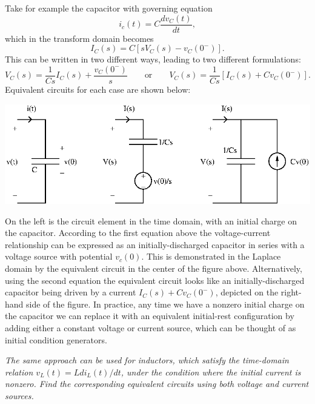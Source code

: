 \documentclass[10pt]{beamer}
\begin{document}
Take for example the capacitor with governing equation
\begin{equation*}
  i_c(t) = C \frac{d v_C(t)}{dt},
\end{equation*}
which in the transform domain becomes
\begin{equation*}
  I_C(s) = C \left[ s V_C(s) - v_C(0^-) \right].
\end{equation*}
This can be written in two different ways, leading to two different formulations:
\begin{equation*}
  V_C(s) = \frac{1}{Cs} I_C(s) + \frac{v_C(0^-)}{s} \qquad \text{or} \qquad
  V_C(s) = \frac{1}{Cs} [ I_C(s) + C v_C(0^-)].
\end{equation*}
Equivalent circuits for each case are shown below:
\begin{center}
  \includegraphics{laplacecapinit}
\end{center}
On the left is the circuit element in the time domain, with an initial charge on the capacitor.  According to the first equation above the voltage-current relationship can be expressed as an initially-discharged capacitor in series with a voltage source with potential $v_c(0)$.  This is demonstrated in the Laplace domain by the equivalent circuit in the center of the figure above.  Alternatively, using the second equation the equivalent circuit looks like an initially-discharged capacitor being driven by a current $I_C(s) + C v_C(0^-)$, depicted on the right-hand side of the figure.  In practice, any time we have a nonzero initial charge on the capacitor we can replace it with an equivalent initial-rest configuration by adding either a constant voltage or current source, which can be thought of as initial condition generators.

{\em The same approach can be used for inductors, which satisfy the time-domain relation $v_L(t) = L d i_L(t)/dt$, under the condition where the initial current is nonzero.  Find the corresponding equivalent circuits using both voltage and current sources.}
\end{document}
